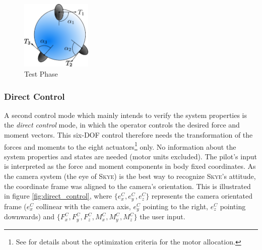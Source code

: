 \begin{figure}[H] %
	\begin{center}
		\includegraphics[width=0.3\textwidth]{TPC.eps}
		\caption[Test Phase]{Test Phase}  
		\label{fig:test_phase}		
	\end{center}
\end{figure}


\subsubsection{Direct Control} 
A second control mode which mainly intends to verify the system properties is the \textit{direct control} mode, in which the operator controls the desired force and moment vectors. This six-DOF control therefore needs the transformation of the forces and moments to the eight actuators\footnote{See \cite{schaffnervu} for details about the optimization criteria for the motor allocation.} only. No information about the system properties and states are needed (motor units excluded). The pilot's input is interpreted as the force and moment components in body fixed coordinates. As the camera system (the eye of \textsc{Skye}) is the best way to recognize \textsc{Skye}'s attitude, the coordinate frame was aligned to the camera's orientation. This is illustrated in figure \ref{fig:direct_control}, where $\{e_x^C, e_y^C, e_z^C\}$ represents the camera orientated frame ($e_x^C$ collinear with the camera axis, $e_y^C$ pointing to the right, $e_z^C$  pointing downwards) and $\{F_x^C, F_y^C, F_z^C, M_x^C, M_y^C, M_z^C\}$ the user input.


